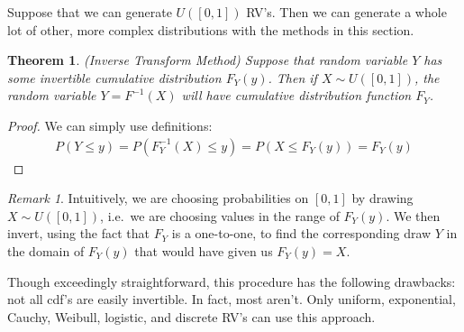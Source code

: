 \documentclass[12pt]{article}
\theoremstyle{plain}
\newtheorem{thm}{Theorem}[section]
\theoremstyle{definition}
\theoremstyle{remark}
\newtheorem*{rmk}{Remark}
\begin{document}
Suppose that we can generate $U([0,1])$ RV's. Then we can generate a
whole lot of other, more complex distributions with the methods in this
section.

\begin{thm}\emph{(Inverse Transform Method)}
Suppose that random variable $Y$ has some invertible cumulative
distribution $F_Y(y)$. Then if $X\sim U([0,1])$, the random variable
$Y = F^{-1}(X)$ will have cumulative distribution function $F_Y$.
\end{thm}

\begin{proof}
We can simply use definitions:
\begin{align*}
  P(Y\leq y) = P(F_Y^{-1}(X) \leq y) = P(X \leq F_Y(y)) = F_Y(y)
\end{align*}
\end{proof}

\begin{rmk}
Intuitively, we are choosing probabilities on $[0,1]$ by drawing $X\sim
U([0,1])$, i.e.\ we are choosing values in the range of $F_Y(y)$. We
then invert, using the fact that $F_Y$ is a one-to-one, to find the
corresponding draw $Y$ in the domain of $F_Y(y)$ that would have given
us $F_Y(y) = X$.

Though exceedingly straightforward, this procedure has the following
drawbacks: not all cdf's are easily invertible. In fact, most aren't.
Only uniform, exponential, Cauchy, Weibull, logistic, and discrete RV's
can use this approach.
\end{rmk}
\end{document}
